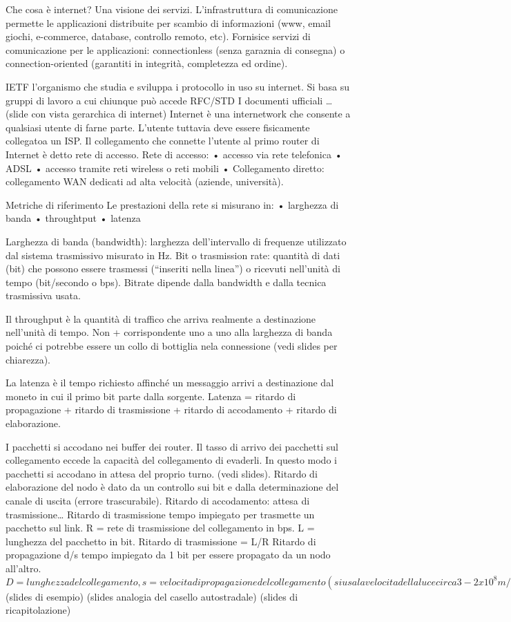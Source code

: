 \documentclass[10pt]{article}
\begin{document}
Che cosa è internet? Una visione dei servizi.
L’infrastruttura di comunicazione permette le applicazioni distribuite per scambio di informazioni (www, email giochi, e-commerce, database, controllo remoto, etc).
Fornisice servizi di comunicazione per le applicazioni: connectionless (senza garaznia di consegna) o connection-oriented (garantiti in integrità, completezza ed ordine).

IETF l’organismo che studia e sviluppa i protocollo in uso su internet. Si basa su gruppi di lavoro a cui chiunque può accede
RFC/STD I documenti ufficiali
…
(slide con vista gerarchica di internet)
Internet è una internetwork che consente a qualsiasi utente di farne parte.
L’utente tuttavia deve essere fisicamente collegatoa un ISP.
Il collegamento che connette l’utente al primo router di Internet è detto rete di accesso.
Rete di accesso:
    • accesso via rete telefonica
    • ADSL
    • accesso tramite reti wireless o reti mobili
    • Collegamento diretto: collegamento WAN dedicati ad alta velocità (aziende, università).

Metriche di riferimento
Le prestazioni della rete si misurano in:
    • larghezza di banda
    • throughtput
    • latenza

Larghezza di banda (bandwidth): larghezza dell’intervallo di frequenze utilizzato dal sistema trasmissivo misurato in Hz.
Bit o trasmission rate: quantità di dati (bit) che possono essere trasmessi (“inseriti nella linea”) o ricevuti nell’unità di tempo (bit/secondo o bps).
Bitrate dipende dalla bandwidth e dalla tecnica trasmissiva usata.

Il throughput è la quantità di traffico che arriva realmente a destinazione nell’unità di tempo. Non + corrispondente uno a uno alla larghezza di banda poiché ci potrebbe essere un collo di bottiglia nela connessione (vedi slides per chiarezza).

La latenza è il tempo richiesto affinché un messaggio arrivi a destinazione dal moneto in cui il primo bit parte dalla sorgente.
Latenza = ritardo di propagazione + ritardo di trasmissione + ritardo di accodamento + ritardo di elaborazione.

I pacchetti si accodano nei buffer dei router. Il tasso di arrivo dei pacchetti sul collegamento eccede la capacità del collegamento di evaderli. In questo modo i pacchetti si accodano in attesa del proprio turno. (vedi slides).
Ritardo di elaborazione del nodo è dato da un controllo sui bit e dalla determinazione del canale di uscita (errore trascurabile).
Ritardo di accodamento: attesa di trasmissione…
Ritardo di trasmissione tempo impiegato per trasmette un pacchetto sul link. R = rete di trasmissione del collegamento in bps. L = lunghezza del pacchetto in bit. Ritardo di trasmissione = L/R
Ritardo di propagazione d/s tempo impiegato da 1 bit per essere propagato da un nodo all’altro.
$D = lunghezza del collegamento, s = velocita di propagazione del collegamento (si usa la velocita della luce circa 3-2x10^8 m/sec). Ritardo di propagazione = d/s$
(slides di esempio)
(slides analogia del casello autostradale)
(slides di ricapitolazione)
\end{document}
